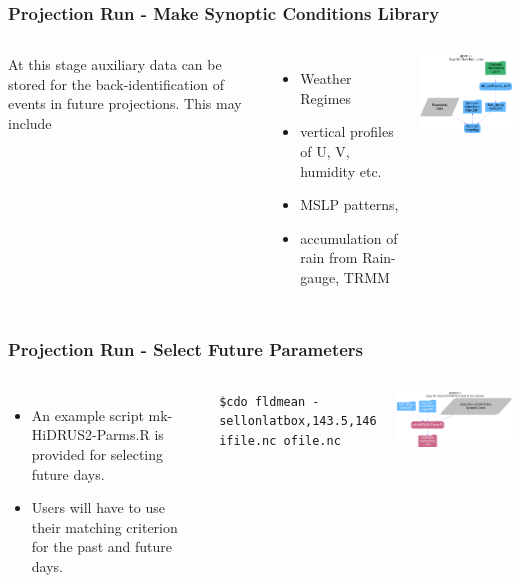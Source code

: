 \documentclass[aspectratio=169]{beamer}
\begin{document}
\begin{frame}[fragile]
\frametitle{Projection Run - Make Synoptic Conditions Library}
\begin{columns}

At this stage auxiliary data can be stored for the back-identification of events in future projections.
This may include 
\begin{itemize}
\item Weather Regimes
\item vertical profiles of U, V, humidity etc.
\item MSLP patterns, 
\item accumulation of rain from Rain-gauge, TRMM
\end{itemize}

\includegraphics[width=2.8in]{../fig/mkRainlib.pdf}

\end{columns}
\end{frame}

\begin{frame}[fragile]
\frametitle{Projection Run - Select Future Parameters}
\begin{columns}

\begin{itemize}
\item An example script mk-HiDRUS2-Parms.R is provided for selecting future days.
\item Users will have to use their matching criterion for the past and future days.
\end{itemize}

\begin{lstlisting}[style=BashInputStyle] 
$cdo fldmean -sellonlatbox,143.5,146,-36.5,-39 ifile.nc ofile.nc
\end{lstlisting}


\includegraphics[width=3.5in]{../fig/selFuturePrm.pdf}

\end{columns}
\end{frame}
\end{document}
